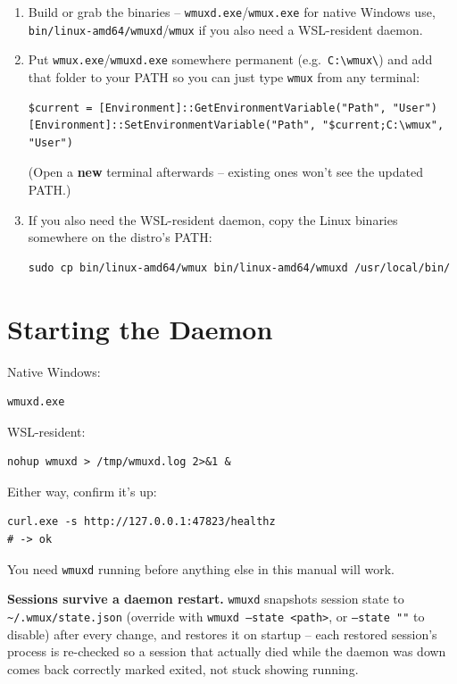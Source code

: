\documentclass{article}
\begin{document}
\begin{enumerate}
  \item Build or grab the binaries -- \texttt{wmuxd.exe}/\texttt{wmux.exe} for native Windows use, \texttt{bin/linux-amd64/wmuxd}/\texttt{wmux} if you also need a WSL-resident daemon.
  \item Put \texttt{wmux.exe}/\texttt{wmuxd.exe} somewhere permanent (e.g.\ \texttt{C:\textbackslash wmux\textbackslash}) and add that folder to your PATH so you can just type \texttt{wmux} from any terminal:
\begin{lstlisting}
$current = [Environment]::GetEnvironmentVariable("Path", "User")
[Environment]::SetEnvironmentVariable("Path", "$current;C:\wmux", "User")
\end{lstlisting}
  (Open a \textbf{new} terminal afterwards -- existing ones won't see the updated PATH.)
  \item If you also need the WSL-resident daemon, copy the Linux binaries somewhere on the distro's PATH:
\begin{lstlisting}
sudo cp bin/linux-amd64/wmux bin/linux-amd64/wmuxd /usr/local/bin/
\end{lstlisting}
\end{enumerate}

\section{Starting the Daemon}

Native Windows:
\begin{lstlisting}
wmuxd.exe
\end{lstlisting}

WSL-resident:
\begin{lstlisting}
nohup wmuxd > /tmp/wmuxd.log 2>&1 &
\end{lstlisting}

Either way, confirm it's up:
\begin{lstlisting}
curl.exe -s http://127.0.0.1:47823/healthz
# -> ok
\end{lstlisting}

You need \texttt{wmuxd} running before anything else in this manual will work.

\textbf{Sessions survive a daemon restart.} \texttt{wmuxd} snapshots session state to \texttt{\textasciitilde/.wmux/state.json} (override with \texttt{wmuxd --state <path>}, or \texttt{--state ""} to disable) after every change, and restores it on startup -- each restored session's process is re-checked so a session that actually died while the daemon was down comes back correctly marked exited, not stuck showing running.
\end{document}
